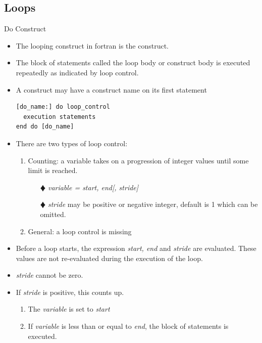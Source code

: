 \documentclass[10pt,t]{beamer}
\begin{document}
\subsection{Loops}
\begin{frame}{Do Construct}
  \begin{itemize}
    \item The looping construct in fortran is the  construct.
    \item The block of statements called the loop body or  construct body is executed repeatedly as indicated by loop control.
    \item A  construct may have a construct name on its first statement
      \begin{lstlisting}[language={[90]Fortran},basicstyle=\fontsize{6}{7}\selectfont\ttfamily]
[do_name:] do loop_control
  execution statements
end do [do_name]
      \end{lstlisting}
    \item There are two types of loop control:
    \begin{enumerate}
      \item Counting: a variable takes on a progression of integer values until some limit is reached.
      \begin{itemize}
        \item[$\vardiamond$] \textit{variable = start, end[, stride] }
        \item[$\vardiamond$] \textit{stride} may be positive or negative integer, default is 1 which can be omitted.
      \end{itemize}
      \item General: a loop control is missing
    \end{enumerate}
    \item Before a  loop starts, the expression \textit{start, end} and \textit{stride} are evaluated. These values are not re-evaluated during the execution of the  loop.
    \item \textit{stride} cannot be zero.
    \item If \textit{stride} is positive, this  counts up.
    \begin{enumerate}
      \scriptsize
      \item The \textit{variable} is set to \textit{start}
      \item If \textit{variable} is less than or equal to \textit{end}, the block of statements is executed.

\end{enumerate}
\end{itemize}
\end{frame}
\end{document}
